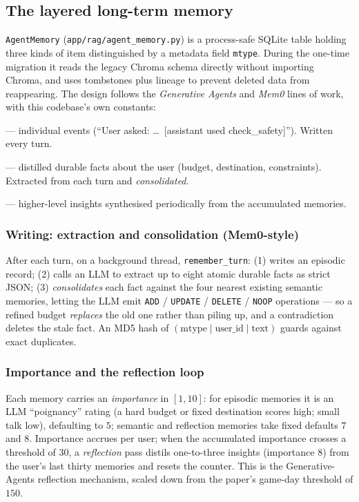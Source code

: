 \documentclass[11pt,a4paper]{article}
\newcommand{\code}[1]{\texttt{\small #1}}
\begin{document}
\subsection{The layered long-term memory}
\code{AgentMemory} (\code{app/rag/agent\_memory.py}) is a process-safe SQLite table
holding three kinds of item distinguished by a metadata field \code{mtype}. During
the one-time migration it reads the legacy Chroma schema directly without importing
Chroma, and uses tombstones plus lineage to prevent deleted data from reappearing.
The design follows the \emph{Generative Agents} and \emph{Mem0} lines of work, with
this codebase's own constants:

\begin{description}[leftmargin=0pt,itemsep=2pt]
  \item[Episodic] --- individual events (``User asked: \dots\ [assistant used
        check\_safety]''). Written every turn.
  \item[Semantic] --- distilled durable facts about the user (budget, destination,
        constraints). Extracted from each turn and \emph{consolidated}.
  \item[Reflection] --- higher-level insights synthesised periodically from the
        accumulated memories.
\end{description}

\subsubsection*{Writing: extraction and consolidation (Mem0-style)}
After each turn, on a background thread, \code{remember\_turn}:
(1) writes an episodic record; (2) calls an LLM to extract up to eight atomic durable
facts as strict JSON; (3) \emph{consolidates} each fact against the four nearest
existing semantic memories, letting the LLM emit \code{ADD} / \code{UPDATE} /
\code{DELETE} / \code{NOOP} operations --- so a refined budget \emph{replaces} the old
one rather than piling up, and a contradiction deletes the stale fact. An MD5 hash
of $(\text{mtype}\mid\text{user\_id}\mid\text{text})$ guards against exact duplicates.

\subsubsection*{Importance and the reflection loop}
Each memory carries an \emph{importance} in $[1,10]$: for episodic memories it is an
LLM ``poignancy'' rating (a hard budget or fixed destination scores high; small talk
low), defaulting to $5$; semantic and reflection memories take fixed defaults $7$ and
$8$. Importance accrues per user; when the accumulated importance crosses a threshold
of $30$, a \emph{reflection} pass distils one-to-three insights (importance $8$) from
the user's last thirty memories and resets the counter. This is the Generative-Agents
reflection mechanism, scaled down from the paper's game-day threshold of $150$.
\end{document}
